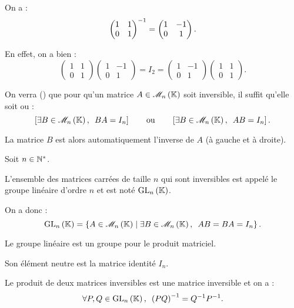\begin{ex}
On a : \[\begin{pmatrix}
1 & 1 \\
0 & 1
\end{pmatrix}^{-1}=\begin{pmatrix}
1 & -1 \\
0 & 1
\end{pmatrix}.\]

En effet, on a bien : \[\begin{pmatrix}
1 & 1 \\
0 & 1
\end{pmatrix}\begin{pmatrix}
1 & -1 \\
0 & 1
\end{pmatrix}=I_2=\begin{pmatrix}
1 & -1 \\
0 & 1
\end{pmatrix}\begin{pmatrix}
1 & 1 \\
0 & 1
\end{pmatrix}.\]
\end{ex}

\begin{rem}
On verra (\cf {}) que pour qu'un matrice \(A\in\M{n}\) soit inversible, il suffit qu'elle soit  ou  : \[\croch{\quantifs{\exists B\in\M{n}}BA=I_n}\qquad\text{ou}\qquad\croch{\quantifs{\exists B\in\M{n}}AB=I_n}.\]

La matrice \(B\) est alors automatiquement l'inverse de \(A\) (à gauche et à droite).
\end{rem}

\begin{defprop}
Soit \(n\in\mathbb{N}^*\).

L'ensemble des matrices carrées de taille \(n\) qui sont inversibles est appelé le groupe linéaire d'ordre \(n\) et est noté \(\GL{n}\).

On a donc : \[\GL{n}=\accol{A\in\M{n}\tq\quantifs{\exists B\in\M{n}}AB=BA=I_n}.\]

Le groupe linéaire est un groupe pour le produit matriciel.

Son élément neutre est la matrice identité \(I_n\).

Le produit de deux matrices inversibles est une matrice inversible et on a : \[\quantifs{\forall P,Q\in\GL{n}}\paren{PQ}\inv=Q\inv P\inv.\]
\end{defprop}

